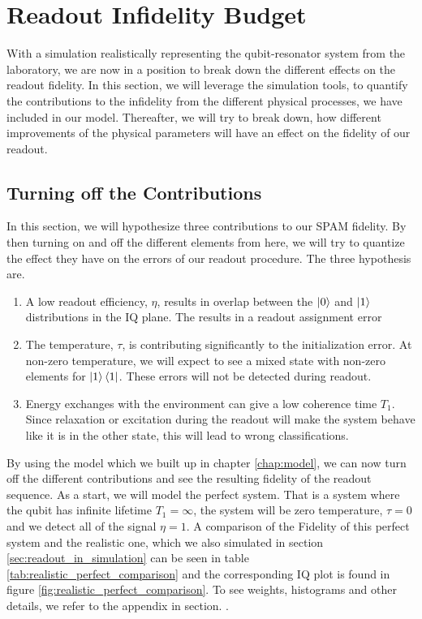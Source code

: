 \chapter{Readout Infidelity Budget} \label{chap:budget}
With a simulation realistically representing the qubit-resonator system from the laboratory, we are now in a position to break down the different effects on the readout fidelity. In this section, we will leverage the simulation tools, to quantify the contributions to the infidelity from the different physical processes, we have included in our model. Thereafter, we will try to break down, how different improvements of the physical parameters will have an effect on the fidelity of our readout. 
\section{Turning off the Contributions}
In this section, we will hypothesize three contributions to our SPAM fidelity. By then turning on and off the different elements from here, we will try to quantize the effect they have on the errors of our readout procedure. The three hypothesis are.
\begin{enumerate}
    \item A low readout efficiency, $\eta$, results in overlap between the $\ket{0}$ and $\ket{1}$ distributions in the IQ plane. The results in a readout assignment error 
    \item The temperature, $\tau$, is contributing significantly to the initialization error. At non-zero temperature, we will expect to see a mixed state with non-zero elements for $\ket{1}\bra{1}$. These errors will not be detected during readout. 
    \item Energy exchanges with the environment can give a low coherence time $T_1$. Since relaxation or excitation during the readout will make the system behave like it is in the other state, this will lead to wrong classifications.
\end{enumerate}
By using the model which we built up in chapter \ref{chap:model}, we can now turn off the different contributions and see the resulting fidelity of the readout sequence. As a start, we will model the perfect system. That is a system where the qubit has infinite lifetime $T_1 = \infty$, the system will be zero temperature, $\tau = 0$ and we detect all of the signal $\eta = 1$. A comparison of the Fidelity of this perfect system and the realistic one, which we also simulated in section \ref{sec:readout_in_simulation} can be seen in table \ref{tab:realistic_perfect_comparison} and the corresponding IQ plot is found in figure \ref{fig:realistic_perfect_comparison}. To see weights, histograms and other details, we refer to the appendix in section. .


